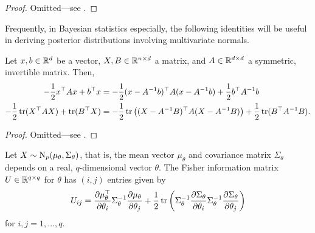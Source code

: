 \begin{proof}
  Omitted---see \citet[§8]{petersen2008matrix}.
\end{proof}

Frequently, in Bayesian statistics especially, the following identities will be useful in deriving posterior distributions involving multivariate normals.

\begin{lemma}
  Let $x,b\in\mathbb{R}^d$ be a vector, $X,B\in\mathbb{R}^{n\times d}$ a matrix, and $A \in \mathbb{R}^{d \times d}$ a symmetric, invertible matrix.
  Then,
  \begin{align*}
    -\frac{1}{2} x^\top A x + b^\top x 
    &= -\frac{1}{2} (x - A^{-1}b)^\top A (x - A^{-1}b) + \frac{1}{2} b^\top A^{-1} b \\
    -\frac{1}{2} \operatorname{tr} (X^\top A X) + \operatorname{tr}(B^\top X)
    &= -\frac{1}{2} \operatorname{tr}\big((X - A^{-1}B)^\top A(X - A^{-1}B) \big) + \frac{1}{2}\operatorname{tr}(B^\top A^{-1} B).
  \end{align*}
\end{lemma}

\begin{proof}
  Omitted---see \citet[§8.1.6]{petersen2008matrix}.
\end{proof}

\newcommand{\dSi}{\frac{\partial\Sigma_\theta}{\partial \theta_i}}
\newcommand{\dSinv}{\frac{\partial\Sigma_\theta^{-1}}{\partial \theta_i}}
\newcommand{\dSj}{\frac{\partial\Sigma_\theta}{\partial \theta_j}}
\newcommand{\dSjnv}{\frac{\partial\Sigma_\theta^{-1}}{\partial \theta_j}}
\newcommand{\dStwo}{\frac{\partial^2\Sigma_\theta}{\partial \theta_i\theta_j}}
\newcommand{\Xmu}{(X - \mu_\theta)}
\newcommand{\dmui}{\frac{\partial\mu_\theta}{\partial\theta_i}}
\newcommand{\dmuj}{\frac{\partial\mu_\theta}{\partial\theta_j}}
\newcommand{\dmuitop}{\frac{\partial\mu_\theta^\top}{\partial\theta_i}}
\newcommand{\dmujtop}{\frac{\partial\mu_\theta^\top}{\partial\theta_j}}
\newcommand{\dmutwo}{\frac{\partial^2\mu_\theta}{\partial\theta_i\partial\theta_j}}


\begin{lemma}
  Let $X\sim\operatorname{N}_p(\mu_\theta,\Sigma_\theta)$, that is, the mean vector $\mu_\theta$ and covariance matrix $\Sigma_\theta$ depends on a real, $q$-dimensional vector $\theta$.
  The Fisher information matrix $U \in \mathbb{R}^{q\times q}$ for $\theta$ has $(i,j)$ entries given by
  \begin{equation}
    U_{ij} = \dmuitop \Sigma_\theta^{-1} \dmuj + \half \tr \left(\Sigma_\theta^{-1} \dSi \Sigma_\theta^{-1} \dSj \right)
  \end{equation}
  for $i,j=1,\dots,q$.
\end{lemma}

